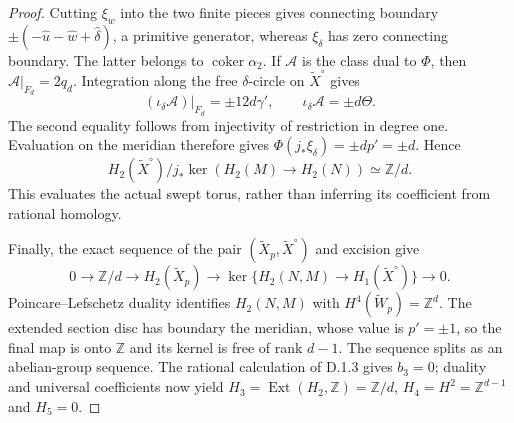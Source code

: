 \begin{proof}
Cutting $\xi_w$ into the two finite pieces gives connecting boundary
$\pm(-\widehat u-\widehat w+\widehat\delta)$, a primitive generator,
whereas $\xi_\delta$ has zero connecting boundary. The latter belongs
to $\operatorname{coker}\alpha_2$. If $\mathcal A$ is the class dual
to $\Phi$, then $\mathcal A|_{F_d}=2q_d$. Integration along the
free $\delta$-circle on $\widetilde X^\circ$ gives
\[
 (\iota_\delta\mathcal A)|_{F_d}=\pm12d\gamma',
 \qquad \iota_\delta\mathcal A=\pm d\Theta.
\]
The second equality follows from injectivity of restriction in degree
one. Evaluation on the meridian therefore gives
$\Phi(j_*\xi_\delta)=\pm d p'=\pm d$. Hence
\[
 H_2(\widetilde X^\circ)/j_*\ker(H_2(M)\to H_2(N))
 \simeq\mathbb Z/d.
\]
This evaluates the actual swept torus, rather than inferring its
coefficient from rational homology.

Finally, the exact sequence of the pair
$(\widetilde X_p,\widetilde X^\circ)$ and excision give
\[
 0\longrightarrow\mathbb Z/d\longrightarrow H_2(\widetilde X_p)
 \longrightarrow\ker\{H_2(N,M)\to H_1(\widetilde X^\circ)\}
 \longrightarrow0.
\]
Poincare--Lefschetz duality identifies $H_2(N,M)$ with
$H^4(\widetilde W_p)=\mathbb Z^d$. The extended section disc has
boundary the meridian, whose value is $p'=\pm1$, so the final map is
onto $\mathbb Z$ and its kernel is free of rank $d-1$. The sequence
splits as an abelian-group sequence. The rational calculation of
D.1.3 gives $b_3=0$; duality and universal coefficients now yield
$H_3=\operatorname{Ext}(H_2,\mathbb Z)=\mathbb Z/d$,
$H_4=H^2=\mathbb Z^{d-1}$ and $H_5=0$.
\end{proof}

